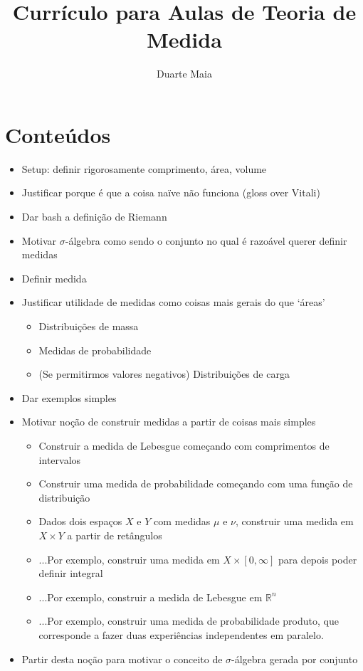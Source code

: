 \documentclass{article}
\title{Currículo para Aulas de Teoria de Medida}
\author{Duarte Maia}
\date{}
\newcommand{\R}{\mathbb{R}}
\begin{document}
\maketitle

\section{Conteúdos}

\begin{itemize}
\item Setup: definir rigorosamente comprimento, área, volume
\item Justificar porque é que a coisa naïve não funciona (gloss over Vitali)
\item Dar bash a definição de Riemann
\item Motivar $\sigma$-álgebra como sendo o conjunto no qual é razoável querer definir medidas
\item Definir medida
\item Justificar utilidade de medidas como coisas mais gerais do que `áreas'
\begin{itemize}
\item Distribuições de massa
\item Medidas de probabilidade
\item (Se permitirmos valores negativos) Distribuições de carga
\end{itemize}
\item Dar exemplos simples
\item Motivar noção de construir medidas a partir de coisas mais simples
\begin{itemize}
\item Construir a medida de Lebesgue começando com comprimentos de intervalos
\item Construir uma medida de probabilidade começando com uma função de distribuição
\item Dados dois espaços $X$ e $Y$ com medidas $\mu$ e $\nu$, construir uma medida em $X \times Y$ a partir de retângulos
\item ...Por exemplo, construir uma medida em $X \times \left[0,\infty\right]$ para depois poder definir integral
\item ...Por exemplo, construir a medida de Lebesgue em $\R^n$
\item ...Por exemplo, construir uma medida de probabilidade produto, que corresponde a fazer duas experiências independentes em paralelo.
\end{itemize}
\item Partir desta noção para motivar o conceito de $\sigma$-álgebra gerada por conjunto

\end{itemize}
\end{document}
